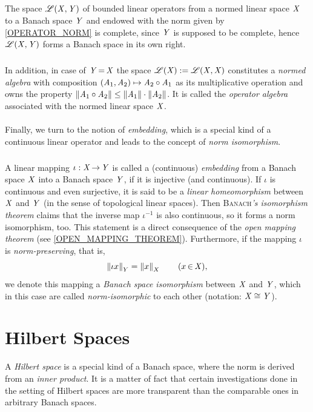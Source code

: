 \documentclass[11pt,twoside]{article}
\begin{document}
\subparagraph{}
The space $\mathscr{L}(\mathit{X},\mathit{Y})$ of bounded linear operators
from a normed linear space $\mathit{X}$ to a Banach space $\mathit{Y}$
and endowed with the norm given by \eqref{OPERATOR_NORM} is complete,
since $\mathit{Y}$ is supposed to be complete,
hence $\mathscr{L}(\mathit{X},\mathit{Y})$ forms a Banach space in its own right.

\subparagraph{}
In addition,
in case of $\mathit{Y} {\,=\,} \mathit{X}$
the space $\mathscr{L}(\mathit{X}) := \mathscr{L}(\mathit{X},\mathit{X})$
constitutes a \textit{normed algebra}
with composition $(\mathit{A}_1,\mathit{A}_2) \mapsto \mathit{A}_2 \circ \mathit{A}_1$
as its multiplicative operation
and owns the property
$\left\lVert \mathit{A}_1 \circ \mathit{A}_2 \right\rVert \leq \left\lVert \mathit{A}_1 \right\rVert \cdot \left\lVert \mathit{A}_2 \right\rVert$.
It is called the \textit{operator algebra}
associated with the normed linear space $\mathit{X}$.

\paragraph{}
Finally,
we turn to the notion of \textit{embedding},
which is a special kind of a continuous linear operator
and leads to the concept of \textit{norm isomorphism}.

\subparagraph{}
A linear mapping $\iota:\mathit{X} {\,\to\,} \mathit{Y}$ is called
a (continuous) \textit{embedding} from a Banach space $\mathit{X}$
into a Banach space $\mathit{Y}$,
if it is injective (and continuous).
If $\iota$ is continuous and even surjective,
it is said to be a \textit{linear homeomorphism}
between $\mathit{X}$ and $\mathit{Y}$
(in the sense of topological linear spaces).
Then \textsc{Banach}\textit{'s isomorphism theorem} claims
that the inverse map $\iota^{-1}$ is also continuous,
so it forms a norm isomorphism, too.
This statement is a direct consequence of the \textit{open mapping theorem}
(see \ref{OPEN_MAPPING_THEOREM}).
Furthermore,
if the mapping $\iota$ is \textit{norm-preserving},
that is,
\[
\left\lVert \iota x \right\rVert_Y = \left\lVert x \right\rVert_X \quad \quad (x {\,\in\,} \mathit{X}),
\]
we denote this mapping a \textit{Banach space isomorphism}
between $\mathit{X}$ and $\mathit{Y}$,
which in this case are called \textit{norm-isomorphic} to each other
(notation: $\mathit{X} \cong \mathit{Y}$).

\section{Hilbert Spaces}
A \textit{Hilbert space} is a special kind of a Banach space,
where the norm is derived from an \textit{inner product}.
It is a matter of fact 
that certain investigations done in the setting of Hilbert spaces
are more transparent than the comparable ones in arbitrary Banach spaces.
\end{document}
